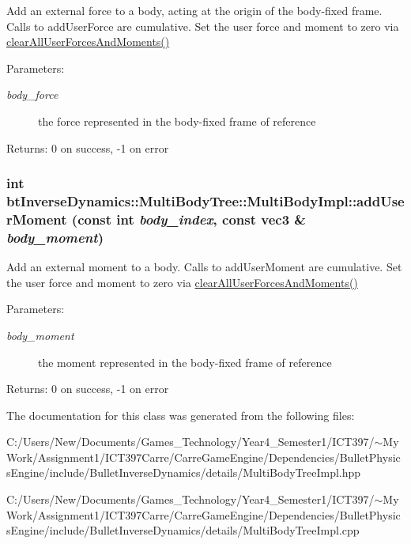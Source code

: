 Add an external force to a body, acting at the origin of the body-fixed frame. Calls to addUserForce are cumulative. Set the user force and moment to zero via \hyperlink{classbt_inverse_dynamics_1_1_multi_body_tree_66402f51ab131c39a4d309196ff7c743}{clearAllUserForcesAndMoments()} \begin{Desc}
\item[Parameters:]
\begin{description}
\item[{\em body\_\-force}]the force represented in the body-fixed frame of reference \end{description}
\end{Desc}
\begin{Desc}
\item[Returns:]0 on success, -1 on error \end{Desc}
 \hypertarget{classbt_inverse_dynamics_1_1_multi_body_tree_1_1_multi_body_impl_ef25e8becc20bc0ceb7dcdfd853098e0}{
\subsubsection[addUserMoment]{\setlength{\rightskip}{0pt plus 5cm}int btInverseDynamics::MultiBodyTree::MultiBodyImpl::addUserMoment (const int {\em body\_\-index}, \/  const {\bf vec3} \& {\em body\_\-moment})}}
\label{classbt_inverse_dynamics_1_1_multi_body_tree_1_1_multi_body_impl_ef25e8becc20bc0ceb7dcdfd853098e0}


Add an external moment to a body. Calls to addUserMoment are cumulative. Set the user force and moment to zero via \hyperlink{classbt_inverse_dynamics_1_1_multi_body_tree_66402f51ab131c39a4d309196ff7c743}{clearAllUserForcesAndMoments()} \begin{Desc}
\item[Parameters:]
\begin{description}
\item[{\em body\_\-moment}]the moment represented in the body-fixed frame of reference \end{description}
\end{Desc}
\begin{Desc}
\item[Returns:]0 on success, -1 on error \end{Desc}
 

The documentation for this class was generated from the following files:\begin{CompactItemize}
\item 
C:/Users/New/Documents/Games\_\-Technology/Year4\_\-Semester1/ICT397/$\sim$My Work/Assignment1/ICT397Carre/CarreGameEngine/Dependencies/BulletPhysicsEngine/include/BulletInverseDynamics/details/MultiBodyTreeImpl.hpp\item 
C:/Users/New/Documents/Games\_\-Technology/Year4\_\-Semester1/ICT397/$\sim$My Work/Assignment1/ICT397Carre/CarreGameEngine/Dependencies/BulletPhysicsEngine/include/BulletInverseDynamics/details/MultiBodyTreeImpl.cpp\end{CompactItemize}
